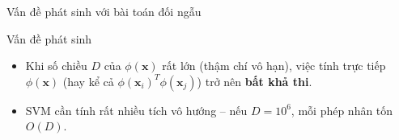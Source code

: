 



\begin{frame}{Vấn đề phát sinh với bài toán đối ngẫu}
    \begin{alertblock}{Vấn đề phát sinh}
        \begin{itemize}
        \item Khi số chiều $D$ của $\phi(\mathbf{x})$ rất lớn (thậm chí vô hạn), việc tính trực tiếp $\phi(\mathbf{x})$ (hay kể cả $\phi(\mathbf{x}_i)^T \phi(\mathbf{x}_j)$) trở nên \textbf{bất khả thi}.
        \item SVM cần tính rất nhiều tích vô hướng – nếu $D = 10^6$, mỗi phép nhân tốn $O(D)$.
        \end{itemize}
    \end{alertblock}

\end{frame}



